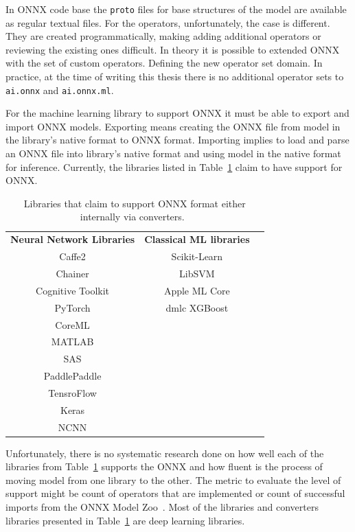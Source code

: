 \documentclass[english, 12pt, a4paper, elec, utf8, online]{aaltothesis}
\begin{document}
In ONNX code base the \texttt{proto} files for base structures of the model are available as regular textual files. For the operators, unfortunately, the case is different. They are created programmatically, making adding additional operators or reviewing the existing ones difficult. In theory it is possible to extended ONNX with the set of custom operators. Defining the new operator set domain. In practice, at the time of writing this thesis there is no additional operator sets to \texttt{ai.onnx} and \texttt{ai.onnx.ml}.

For the machine learning library to support ONNX it must be able to export and import ONNX models. Exporting means creating the ONNX file from model in the library's native format to ONNX format. Importing implies to load and parse an ONNX file into library's native format and using model in the native format for inference. Currently, the libraries listed in Table~\ref{tab:onnx_libraries} claim to have support for ONNX.

\begin{table}[h!]
\begin{center}
\caption{Libraries that claim to support ONNX format either internally via converters.~\cite{onnx_tools}} \label{tab:onnx_libraries}
\begin{tabular}{ c c c }
 \textbf{Neural Network Libraries} & \textbf{Classical ML libraries} \\	
 Caffe2            & Scikit-Learn  \\ 
 Chainer           & LibSVM  \\  
 Cognitive Toolkit & Apple ML Core \\    
 PyTorch           & dmlc XGBoost \\
 CoreML            \\
 MATLAB            \\
 SAS               \\
 PaddlePaddle      \\ 
 TensroFlow        \\
 Keras             \\
 NCNN              \\
\end{tabular}
\end{center}
\end{table}

Unfortunately, there is no systematic research done on how well each of the libraries from Table~\ref{tab:onnx_libraries} supports the ONNX and how fluent is the process of moving model from one library to the other. The metric to evaluate the level of support might be count of operators that are implemented or count of successful imports from the ONNX Model Zoo~\cite{onnx_model_zoo}. Most of the libraries and converters libraries presented in Table~\ref{tab:onnx_libraries} are deep learning libraries. 
\end{document}
